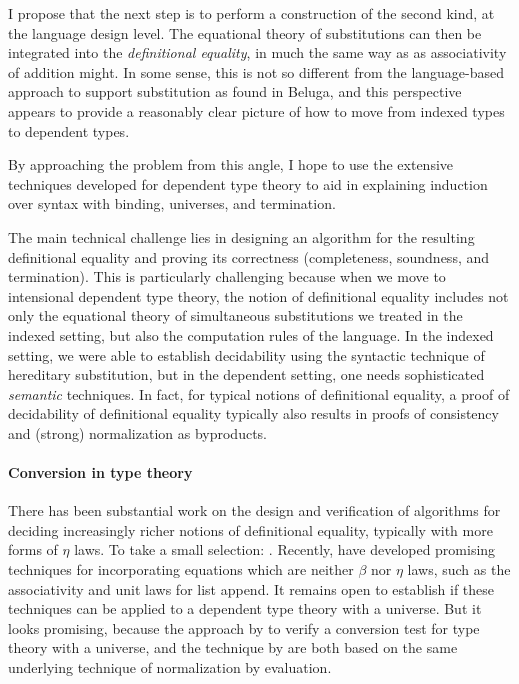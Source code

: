 \documentclass{article}
\begin{document}
I propose that the next step is to perform a construction of the
second kind, at the language design level. The equational theory of
substitutions can then be integrated into the \emph{definitional
 equality}, in much the same way as as associativity of addition
might. In some sense, this is not so
different from the language-based approach to support
substitution as found in Beluga, and this perspective appears to
provide a reasonably clear
picture of how to move from indexed types to dependent types.

By approaching the problem from this angle, I hope to use the
extensive techniques developed for dependent type theory to aid in
explaining induction over syntax with binding, universes, and
termination.

The main technical challenge lies in designing an algorithm for the
resulting definitional equality and proving its correctness
(completeness, soundness, and termination). This is particularly
challenging because when we move to intensional dependent type theory,
the notion of definitional equality includes not only the 
equational theory of simultaneous substitutions we treated in the
indexed setting, but also the computation rules of the language. In
the indexed setting, we were able to establish decidability using the
syntactic technique of hereditary substitution, but in the dependent
setting, one needs sophisticated \emph{semantic} techniques. In fact,
for typical notions of definitional equality, a proof of decidability
of definitional equality typically also results in proofs of
consistency and (strong) normalization as byproducts.


\paragraph{Conversion in type theory} There has been substantial work on the design and verification
of algorithms for deciding increasingly richer notions of definitional
equality, typically with more forms of $\eta$ laws. To take a
small selection: \cite{Coquand91,Harper05,Abel11}. Recently,
\cite{Allais13} have developed promising techniques for incorporating equations
which are neither $\beta$ nor $\eta$ laws, such as the associativity
and unit laws for list append. It remains open to establish if 
these techniques can be applied to a dependent type theory with a
universe. But it looks promising, because the approach by
\cite{Abel07} to verify a conversion test for type theory with a
universe, and the technique by \cite{Allais13} are both based on the
same underlying technique of normalization by evaluation.
\end{document}
